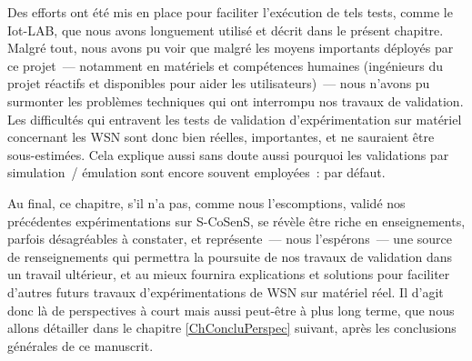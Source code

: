 Des efforts ont été mis en place pour faciliter l'exécution de tels tests,
comme le  Iot-LAB, que nous avons longuement utilisé et
décrit dans le présent chapitre. Malgré tout, nous avons pu voir que
malgré les moyens importants déployés par ce projet~--- notamment en
matériels et compétences humaines (ingénieurs du projet réactifs et
disponibles pour aider les utilisateurs)~--- nous n'avons pu surmonter
les problèmes techniques qui ont interrompu nos travaux de validation.
Les difficultés qui entravent les tests de validation d'expérimentation
sur matériel concernant les WSN sont donc bien réelles, importantes, et
ne sauraient être sous-estimées. Cela explique aussi sans doute aussi
pourquoi les validations par simulation~/ émulation sont encore souvent
employées~: par défaut.

\bigskip

Au final, ce chapitre, s'il n'a pas, comme nous l'escomptions, validé nos
précédentes expérimentations sur S-CoSenS, se révèle être riche en
enseignements, parfois désagréables à constater, et représente~--- nous
l'espérons~--- une source de renseignements qui permettra la poursuite de
nos travaux de validation dans un travail ultérieur, et au mieux fournira
explications et solutions pour faciliter d'autres futurs travaux
d'expérimentations de WSN sur matériel réel. Il d'agit donc là de
perspectives à court mais aussi peut-être à plus long terme, que nous allons
détailler dans le chapitre \ref{ChConcluPerspec} suivant, après
les conclusions générales de ce manuscrit.



